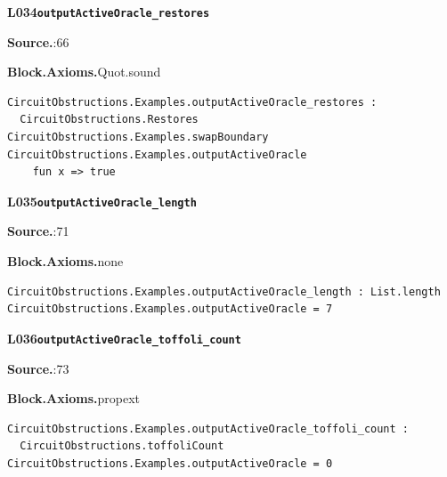 \par\medskip\noindent\begin{minipage}{\textwidth}
{\small\bfseries L034\enspace\texttt{outputActiveOracle\_restores}\par}
{\footnotesize\raggedright\textbf{Source.}\enspace{}:66\par
\textbf{Block.}\quad\textbf{Axioms.}\enspace Quot.sound\par}\nopagebreak
\begin{lstlisting}
CircuitObstructions.Examples.outputActiveOracle_restores :
  CircuitObstructions.Restores CircuitObstructions.Examples.swapBoundary CircuitObstructions.Examples.outputActiveOracle
    fun x => true
\end{lstlisting}
\end{minipage}\par

\par\medskip\noindent\begin{minipage}{\textwidth}
{\small\bfseries L035\enspace\texttt{outputActiveOracle\_length}\par}
{\footnotesize\raggedright\textbf{Source.}\enspace{}:71\par
\textbf{Block.}\quad\textbf{Axioms.}\enspace none\par}\nopagebreak
\begin{lstlisting}
CircuitObstructions.Examples.outputActiveOracle_length : List.length CircuitObstructions.Examples.outputActiveOracle = 7
\end{lstlisting}
\end{minipage}\par

\par\medskip\noindent\begin{minipage}{\textwidth}
{\small\bfseries L036\enspace\texttt{outputActiveOracle\_toffoli\_count}\par}
{\footnotesize\raggedright\textbf{Source.}\enspace{}:73\par
\textbf{Block.}\quad\textbf{Axioms.}\enspace propext\par}\nopagebreak
\begin{lstlisting}
CircuitObstructions.Examples.outputActiveOracle_toffoli_count :
  CircuitObstructions.toffoliCount CircuitObstructions.Examples.outputActiveOracle = 0
\end{lstlisting}
\end{minipage}\par

